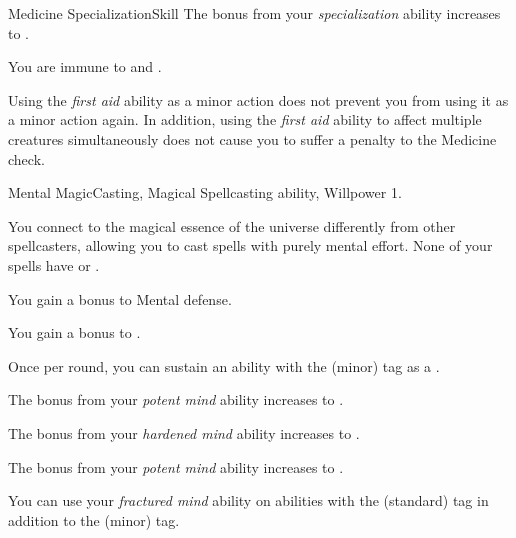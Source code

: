 \begin{feat}{Medicine Specialization}{Skill}
         The bonus from your \textit{specialization} ability increases to .

         You are immune to  and .

         Using the \textit{first aid} ability as a minor action does not prevent you from using it as a minor action again.
        In addition, using the \textit{first aid} ability to affect multiple creatures simultaneously does not cause you to suffer a penalty to the Medicine check.
    \end{feat}

    \begin{feat}{Mental Magic}{Casting, Magical}
        \featpre Spellcasting ability, Willpower 1.

         You connect to the magical essence of the universe differently from other spellcasters, allowing you to cast spells with purely mental effort.
        None of your spells have  or .

         You gain a  bonus to Mental defense.

         You gain a  bonus to .

         Once per round, you can sustain an ability with the  (minor) tag as a .

         The bonus from your \textit{potent mind} ability increases to .

         The bonus from your \textit{hardened mind} ability increases to .

         The bonus from your \textit{potent mind} ability increases to .

         You can use your \textit{fractured mind} ability on abilities with the  (standard) tag in addition to the  (minor) tag.
    \end{feat}

